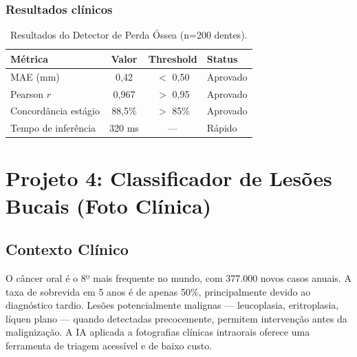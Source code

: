 \subsubsection{Resultados clínicos}

\begin{table}[H]
  \centering
  \caption{Resultados do Detector de Perda Óssea (n=200 dentes).}
  \label{tab:boneloss-results}
  \begin{tabularx}{\textwidth}{lccX}
    \toprule
    \textbf{Métrica} & \textbf{Valor} & \textbf{Threshold} & \textbf{Status} \\
    \midrule
    MAE (mm) & 0,42 & $<$ 0,50 & \textcolor{corTesteSucesso}{Aprovado} \\
    Pearson $r$ & 0,967 & $>$ 0,95 & \textcolor{corTesteSucesso}{Aprovado} \\
    Concordância estágio & 88,5\% & $>$ 85\% & \textcolor{corTesteSucesso}{Aprovado} \\
    Tempo de inferência & 320 ms & — & Rápido \\
    \bottomrule
  \end{tabularx}
\end{table}


\section{Projeto 4: Classificador de Lesões Bucais (Foto Clínica)}

\subsection{Contexto Clínico}

O câncer oral é o 8º mais frequente no mundo, com 377.000 novos casos
anuais. A taxa de sobrevida em 5 anos é de apenas 50\%, principalmente
devido ao diagnóstico tardio. Lesões potencialmente malignas — leucoplasia,
eritroplasia, líquen plano — quando detectadas precocemente, permitem
intervenção antes da malignização. A IA aplicada a fotografias clínicas
intraorais oferece uma ferramenta de triagem acessível e de baixo custo.

